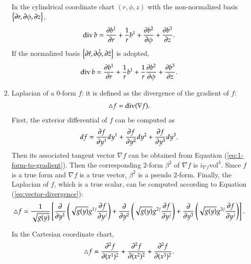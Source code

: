 \documentclass[11pt, a4paper]{book}
\begin{document}
\begin{enumerate}
 In the cylindrical coordinate chart $(r,\phi,z)$ with the non-normalized basis $\left\{
   \boldsymbol{\partial}r, \boldsymbol{\partial}\phi, \boldsymbol{\partial}z \right\}$,
 \begin{equation}
   \label{eq:div-expr-cylindrival-coordinate-nonnormalized-basis}
   \operatorname{div} b = \frac{\partial b^{1}}{\partial r} + \frac{1}{r}b^1 + \frac{\partial
     b^{2}}{\partial \phi} + \frac{\partial b^{3}}{\partial z}.
 \end{equation}
 If the normalized basis $\left\{ \boldsymbol{\partial}\hat{r}, \boldsymbol{\partial}\hat{\phi},
   \boldsymbol{\partial}\hat{z} \right\}$ is adopted,
 \begin{equation}
   \label{eq:div-expr-cylindrival-coordinate-normalized-basis}
   \operatorname{div} b = \frac{\partial b^{1}}{\partial r} + \frac{1}{r}b^1 +
   \frac{1}{r}\frac{\partial b^{2}}{\partial \phi} + \frac{\partial b^{3}}{\partial z}.
 \end{equation}
\item Laplacian of a 0-form $f$: it is defined as the divergence of the gradient of $f$:
  \begin{equation}
    \label{eq:laplacian}
    \triangle f = \operatorname{div}(\nabla f).
  \end{equation}
  First, the exterior differential of $f$ can be computed as
  \begin{equation}
    df = \frac{\partial f}{\partial y^{1}} dy^1 + \frac{\partial f}{\partial y^{2}} dy^2 +
    \frac{\partial f}{\partial y^{3}} dy^3.
  \end{equation}
  Then its associated tangent vector $\nabla f$ can be obtained from Equation
  (\ref{eq:1-form-to-gradient}). Then the corresponding 2-form $\beta^2$ of $\nabla f$ is
  $i_{\nabla f} \mathrm{vol}^3$. Since $f$ is a true form and $\nabla f$ is a true vector,
  $\beta^2$ is a pseudo 2-form. Finally, the Laplacian of $f$, which is a true scalar, can
  be computed according to Equation (\ref{eq:vector-divergence}):
  \begin{equation}
    \label{eq:laplacian-expr-general}
    \triangle f = \frac{1}{\sqrt{g(y)}} \left[ \frac{\partial}{\partial y^1} \left(
        \sqrt{g(y)} g^{1j} \frac{\partial f}{\partial y^{j}} \right) + \frac{\partial}{\partial
        y^2} \left( \sqrt{g(y)}g^{2j} \frac{\partial f}{\partial y^{j}} \right) +
      \frac{\partial}{\partial y^3} \left( \sqrt{g(y)} g^{3j} \frac{\partial f}{\partial y^{j}}
      \right) \right].
  \end{equation}

  In the Cartesian coordinate chart,
  \begin{equation}
    \label{eq:laplacian-expr-cartesian}
    \triangle f = \frac{\partial^2 f}{\partial (x^1)^2} + \frac{\partial^2 f}{\partial (x^2)^2} +
    \frac{\partial^2 f}{\partial (x^3)^2}.
  \end{equation}


\end{enumerate}
\end{document}
